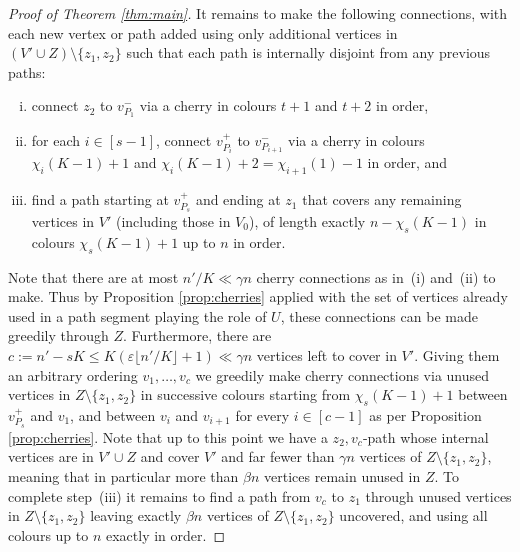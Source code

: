 \documentclass[11pt, dvipsnames]{amsart}
\theoremstyle{plain}
\theoremstyle{definition}
\newcommand{\sm}{\setminus}
\newcommand{\eps}{\varepsilon}
\begin{document}
\begin{proof}[Proof of Theorem \ref{thm:main}]
It remains to make the following connections, with each new vertex or path added using only additional vertices in $(V' \cup Z)\setminus\{z_1, z_2\}$ such that each path is internally disjoint from any previous paths:
\begin{enumerate}[(i)]
\item connect $z_2$ to $v_{P_1}^-$ via a cherry in colours $t+1$ and $t+2$ in order, 
\item for each $i \in [s-1]$, connect $v_{P_i}^+$ to $v_{P_{i+1}}^-$ via a cherry in colours $\chi_i(K-1)+1$ and $\chi_i(K-1)+2=\chi_{i+1}(1)-1$ in order, and
\item find a path starting at $v_{P_s}^+$ and ending at $z_1$ that covers any remaining vertices in $V'$ (including those in $V_0$), of length exactly $n-\chi_s(K-1)$ in colours $\chi_s(K-1)+1$ up to $n$ in order.
\end{enumerate}
Note that  there are at most $n'/K \ll \gamma n$ cherry connections as in~(i) and~(ii) to make. Thus by Proposition \ref{prop:cherries} applied with the set of vertices already used in a path segment playing the role of $U$, these connections can be made greedily through $Z$. Furthermore, there are $c:= n'-sK\leq K\left(\eps \lfloor n'/K\rfloor+1\right) \ll \gamma n$ vertices left to cover in $V'$. 
Giving them an arbitrary ordering $v_1, \ldots, v_c$ we greedily make cherry connections via unused vertices in $Z\sm \{z_1,z_2\}$ in successive colours starting from $\chi_s(K-1)+1$ between $v_{P_s}^+$ and $v_1$, and between $v_i$ and $v_{i+1}$ for every $i \in [c-1]$ as per Proposition \ref{prop:cherries}. 
Note that up to this point we have a $z_2,v_c$-path whose internal vertices are in $V' \cup Z$ and cover $V'$ and far fewer than $\gamma n$ vertices of $Z\sm \{z_1,z_2\}$, meaning that in particular more than $\beta n$ vertices remain unused in $Z$. To complete step~(iii) it remains to find a path from $v_c$ to $z_1$ through unused vertices in $Z\sm \{z_1,z_2\}$ leaving exactly $\beta n$ vertices of $Z\sm \{z_1,z_2\}$ uncovered, and using all colours up to $n$ exactly in order. 


\end{proof}
\end{document}
